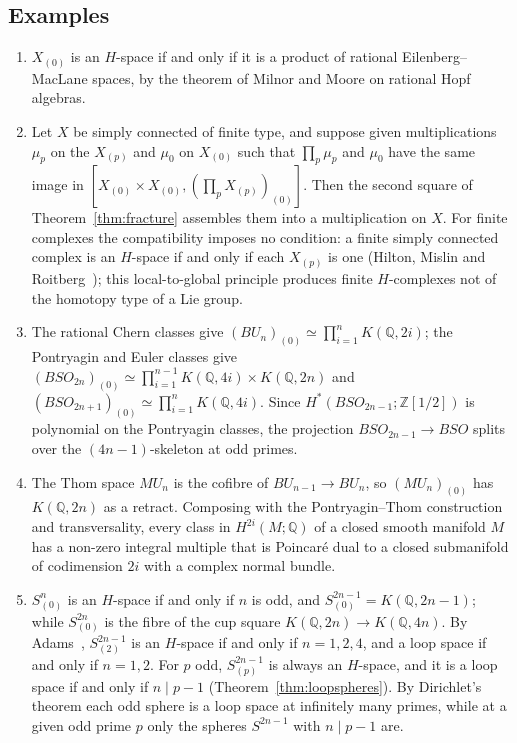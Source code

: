 \documentclass[11pt]{amsart}
\theoremstyle{plain}
\theoremstyle{definition}
\numberwithin{equation}{section}
\newcommand{\Z}{\mathbb{Z}}
\newcommand{\Q}{\mathbb{Q}}
\begin{document}
\subsection{Examples}\label{subsec:locexamples}
\begin{enumerate}[label=(\arabic*),leftmargin=*]
\item $X_{(0)}$ is an $H$-space if and only if it is a product of rational Eilenberg--MacLane spaces, by the theorem of Milnor and Moore on rational Hopf algebras.
\item Let $X$ be simply connected of finite type, and suppose given multiplications $\mu_p$ on the $X_{(p)}$ and $\mu_0$ on $X_{(0)}$ such that $\prod_p\mu_p$ and $\mu_0$ have the same image in $[X_{(0)}\times X_{(0)},(\prod_pX_{(p)})_{(0)}]$.
Then the second square of Theorem~\ref{thm:fracture} assembles them into a multiplication on $X$.
For finite complexes the compatibility imposes no condition: a finite simply connected complex is an $H$-space if and only if each $X_{(p)}$ is one (Hilton, Mislin and Roitberg~\cite{HMR}); this local-to-global principle produces finite $H$-complexes not of the homotopy type of a Lie group.
\item The rational Chern classes give $(BU_n)_{(0)}\simeq\prod_{i=1}^nK(\Q,2i)$; the Pontryagin and Euler classes give $(BSO_{2n})_{(0)}\simeq\prod_{i=1}^{n-1}K(\Q,4i)\times K(\Q,2n)$ and $(BSO_{2n+1})_{(0)}\simeq\prod_{i=1}^nK(\Q,4i)$.
Since $H^*(BSO_{2n-1};\Z[1/2])$ is polynomial on the Pontryagin classes, the projection $BSO_{2n-1}\to BSO$ splits over the $(4n-1)$-skeleton at odd primes.
\item The Thom space $MU_n$ is the cofibre of $BU_{n-1}\to BU_n$, so $(MU_n)_{(0)}$ has $K(\Q,2n)$ as a retract.
Composing with the Pontryagin--Thom construction and transversality, every class in $H^{2i}(M;\Q)$ of a closed smooth manifold $M$ has a non-zero integral multiple that is Poincar\'e dual to a closed submanifold of codimension $2i$ with a complex normal bundle.
\item $S^n_{(0)}$ is an $H$-space if and only if $n$ is odd, and $S^{2n-1}_{(0)}=K(\Q,2n-1)$; while $S^{2n}_{(0)}$ is the fibre of the cup square $K(\Q,2n)\to K(\Q,4n)$.
By Adams~\cite{AdamsHopf}, $S^{2n-1}_{(2)}$ is an $H$-space if and only if $n=1,2,4$, and a loop space if and only if $n=1,2$.
For $p$ odd, $S^{2n-1}_{(p)}$ is always an $H$-space, and it is a loop space if and only if $n\mid p-1$ (Theorem~\ref{thm:loopspheres}).
By Dirichlet's theorem each odd sphere is a loop space at infinitely many primes, while at a given odd prime $p$ only the spheres $S^{2n-1}$ with $n\mid p-1$ are.
\end{enumerate}
\end{document}
